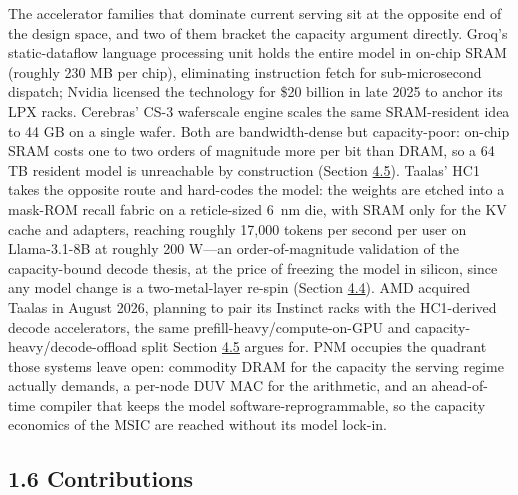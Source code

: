\documentclass[10pt,twocolumn]{article}
\begin{document}
The accelerator families that dominate current serving sit at the opposite end of the design space, and two of them bracket the capacity argument directly. Groq's static-dataflow language processing unit holds the entire model in on-chip SRAM (roughly 230 MB per chip), eliminating instruction fetch for sub-microsecond dispatch; Nvidia licensed the technology for \$20 billion in late 2025 to anchor its LPX racks\cite{38}. Cerebras' CS-3 waferscale engine scales the same SRAM-resident idea to 44 GB on a single wafer\cite{39}. Both are bandwidth-dense but capacity-poor: on-chip SRAM costs one to two orders of magnitude more per bit than DRAM, so a 64 TB resident model is unreachable by construction (Section \hyperref[sec:4.5]{4.5}). Taalas' HC1 takes the opposite route and hard-codes the model: the weights are etched into a mask-ROM recall fabric on a reticle-sized 6~nm die, with SRAM only for the KV cache and adapters, reaching roughly 17,000 tokens per second per user on Llama-3.1-8B at roughly 200 W\cite{40}---an order-of-magnitude validation of the capacity-bound decode thesis, at the price of freezing the model in silicon, since any model change is a two-metal-layer re-spin (Section \hyperref[sec:4.4]{4.4}). AMD acquired Taalas in August 2026, planning to pair its Instinct racks with the HC1-derived decode accelerators\cite{41}, the same prefill-heavy/compute-on-GPU and capacity-heavy/decode-offload split Section \hyperref[sec:4.5]{4.5} argues for. PNM occupies the quadrant those systems leave open: commodity DRAM for the capacity the serving regime actually demands, a per-node DUV MAC for the arithmetic, and an ahead-of-time compiler that keeps the model software-reprogrammable, so the capacity economics of the MSIC are reached without its model lock-in.

\subsection*{1.6 Contributions}\label{sec:1.6}
\end{document}
